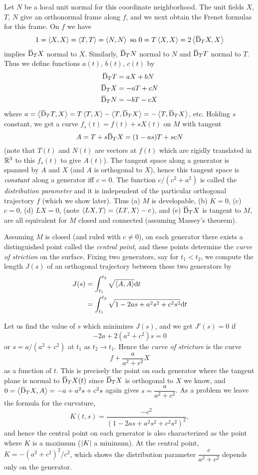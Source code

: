 \documentclass[../main]{subfiles}
\begin{document}
Let $N$ be a local unit normal for this coordinate neighborhood. The unit fields $X$, $T$, $N$ give an orthonormal frame along $f$, and we next obtain the Frenet formulas for this frame. On $f$ we have 
\[ 1 = \ip{X}{X} = \ip{T}{T} = \ip{N}{N} \text{ so } 0 = T\ip{X}{X} = 2\ip{\covariant_TX}{X} \]
implies $\covariant_TX$ normal to $X$. Similarly, $\covariant_TN$ normal to $N$ and $\covariant_TT$ normal to $T$. Thus we define functions $a(t)$, $b(t)$, $c(t)$ by
\[
\begin{aligned}
    \covariant_TT &= aX +bN\\
    \covariant_TX &= -aT+cN\\
    \covariant_TN &= -bT-cX
\end{aligned}
\]
where $a = \ip{\covariant_TT}{X} = T\ip{T}{X} - \ip{T}{\covariant_TX}=-\ip{T}{\covariant_TX}$, etc. Holding $s$ constant, we get a curve $f_s(t) = f(t) + sX(t)$ on $M$ with tangent
\[ A = T+s\covariant_TX = (1-as)T+scN \]
(note that $T(t)$ and $N(t)$ are vectors at $f(t)$ which are rigidly translated in $\mathbb{R}^3$ to this $f_s(t)$ to give $A(t)$). The tangent space along a generator is spanned by $A$ and $X$ (and $A$ is orthogonal to $X$), hence this tangent space is $\emph{constant}$ along a generator iff $c=0$. The function $c/(c^2+a^2)$ is called the \emph{distribution parameter} and it is independent of the particular orthogonal trajectory $f$ (which we show later). Thus (a) $M$ is developable, (b) $K=0$, (c) $c=0$, (d) $LX = 0$, (note $\left\langle LX,T\right\rangle = \left\langle LT,X\right\rangle-c$), and (e) $\covariant_TX$ is tangent to $M$, are all equivalent for $M$ closed and connected (assuming Massey's theorem). 

Assuming $M$ is closed (and ruled with $c\ne 0$), on each generator there exists a distinguished point called the \emph{central point}, and these points determine the \emph{curve of striction} on the surface. Fixing two generators, say for $t_1 < t_2$, we compute the length $J(s)$ of an orthogonal trajectory between these two generators by
\[
\begin{aligned}
J(s) &= \int_{t_1}^{t_2} \sqrt{\left\langle A,A\right\rangle}\mathrm{d}t \\
&= \int_{t_1}^{t_2} \sqrt{1-2as+a^2s^2 + c^2s^2} \mathrm{d}t
\end{aligned}
\]

Let us find the value of $s$ which minimizes $J(s)$, and we get $J'(s) = 0$ if
\[ -2a+2(a^2+c^2)s= 0\]
or $s = a/(a^2+c^2)$ at $t_1$ as $t_2 \to t_1$. Hence the \emph{curve of stricture} is the curve
\[ f+\frac{a}{a^2+c^2}X \]
as a function of $t$. This is precisely the point on each generator where the tangent plane is normal to $\covariant_TX(t)$ since $\covariant_TX$ is orthogonal to $X$ we know, and\newline $0 = \ip{\covariant_TX}{A} = -a+a^2s+c^2s$ again gives $s=\dfrac{a}{a^2+c^2}$. As a problem we leave the formula for the curvature,
\[ K(t, s) = \frac{-c^2}{(1-2as+a^2s^2+c^2s^2)^2}, \]
and hence the central point on each generator is also characterized as the point where $K$ is a maximum ($\left|K\right|$ a minimum). At the central point, \newline $K = -(a^2+c^2)^2/c^2$, which shows the distribution parameter $\dfrac{c}{a^2+c^2}$ depends only on the generator.
\end{document}
